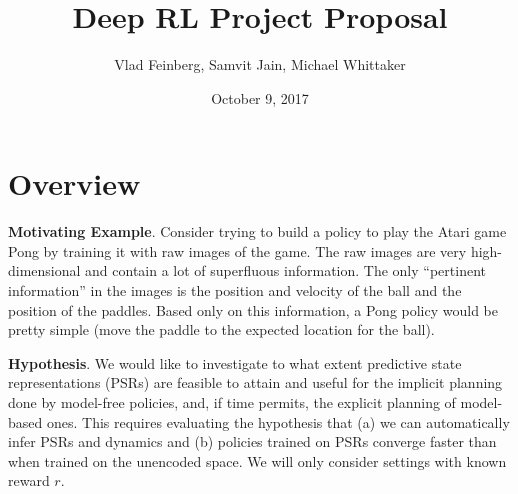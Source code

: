 \documentclass{report}
\title{Deep RL Project Proposal}
\author{Vlad Feinberg, Samvit Jain, Michael Whittaker}
\date{October 9, 2017}
\begin{document}
\maketitle{}

\section*{Overview}

\textbf{Motivating Example}. Consider trying to build a policy to play the Atari
game Pong by training it
with raw images of the game. The raw images are
very high-dimensional and contain a lot of superfluous information. The only
``pertinent information'' in the images is the position and velocity of the
ball and the position of the paddles. Based only on this information, a Pong
policy would be pretty simple (move the paddle to the expected location for
the ball).

\textbf{Hypothesis}.
We would like to investigate to what extent predictive state representations (PSRs)
are feasible to attain and useful for the implicit planning done by model-free
policies, and, if time
permits, the explicit planning of model-based ones. This requires evaluating
the hypothesis
that (a) we can automatically infer PSRs and dynamics and (b) policies
trained on PSRs converge faster than when trained
on the unencoded space. We will only consider settings with known reward $r$.
\end{document}

